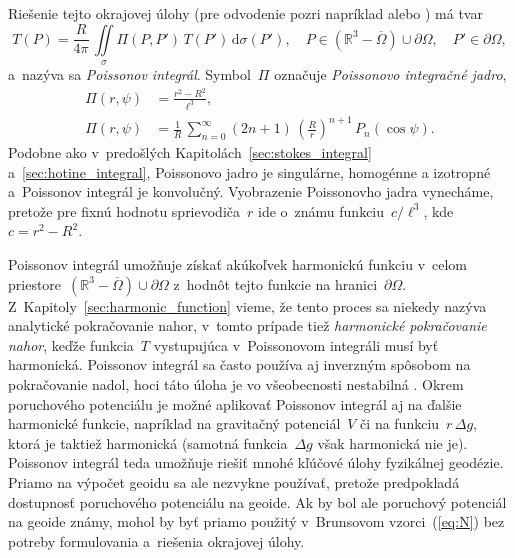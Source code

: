 \documentclass[a4paper, 12pt]{book}
\newcommand{\diff}{\mathrm d}
\begin{document}
Riešenie tejto okrajovej úlohy (pre odvodenie pozri napríklad 
\cite{MoritzPhysicalGeodesy} alebo \cite{SansoGeoidDetermination}) má tvar
%
\begin{equation}
\label{eq:poisson}
T(P) = \frac{R}{4\pi} \, \iint\limits_\sigma \Pi(P, P') \, T(P') \, 
\diff\sigma(P'){,} \quad P \in \left( \mathbb{R}^3 - \overline\Omega \right) 
\cup \partial\Omega{,} \quad P' \in \partial\Omega{,}
\end{equation}
%
a~nazýva sa \emph{Poissonov integrál}.  Symbol~$\Pi$ označuje \emph{Poissonovo 
integračné jadro},
%
\begin{align}
\Pi(r, \psi) &= \frac{r^2 - R^2}{\ell^3}{,}\label{eq:poisson_kernel}\\
\Pi(r, \psi) &= \frac{1}{R} \, \sum_{n = 0}^{\infty} (2n + 1) \, \left( 
\frac{R}{r} \right)^{n + 1} \, 
P_n(\cos\psi)\label{eq:poisson_kernel_spectral}{.}
\end{align}
%
Podobne ako v~predošlých Kapitolách~\ref{sec:stokes_integral} 
a~\ref{sec:hotine_integral}, Poissonovo jadro je singulárne, homogénne 
a izotropné a~Poissonov integrál je konvolučný.  Vyobrazenie Poissonovho jadra 
vynecháme, pretože pre fixnú hodnotu sprievodiča~$r$ ide o~známu funkciu~$c 
\slash \ell^3$, kde $c = r^2 - R^2$.

Poissonov integrál umožňuje získať akúkoľvek harmonickú funkciu v~celom 
priestore~$\left( \mathbb{R}^3 - \overline\Omega \right) \cup \partial\Omega$ 
z~hodnôt tejto funkcie na hranici~$\partial\Omega$.  
Z~Kapitoly~\ref{sec:harmonic_function} vieme, že tento proces sa niekedy nazýva 
analytické pokračovanie nahor, v~tomto prípade tiež \emph{harmonické 
pokračovanie nahor}, keďže funkcia~$T$ vystupujúca v~Poissonovom integráli musí 
byť harmonická.  Poissonov integrál sa často používa aj inverzným spôsobom na 
pokračovanie nadol, hoci táto úloha je vo všeobecnosti nestabilná 
\parencite{SansoGeodeticBoundaryValueProblem}.  Okrem poruchového potenciálu je 
možné aplikovať Poissonov integrál aj na ďalšie harmonické funkcie, napríklad 
na gravitačný potenciál~$V$ či na funkciu~$r \, \Delta g$, ktorá je taktiež 
harmonická (samotná funkcia~$\Delta g$ však harmonická nie je).  Poissonov 
integrál teda umožňuje riešiť mnohé kľúčové úlohy fyzikálnej geodézie.  Priamo 
na výpočet geoidu sa ale nezvykne používať, pretože predpokladá dostupnosť 
poruchového potenciálu na geoide.  Ak by bol ale poruchový potenciál na geoide 
známy, mohol by byť priamo použitý v~Brunsovom vzorci~(\ref{eq:N}) bez potreby 
formulovania a~riešenia okrajovej úlohy.
\end{document}
